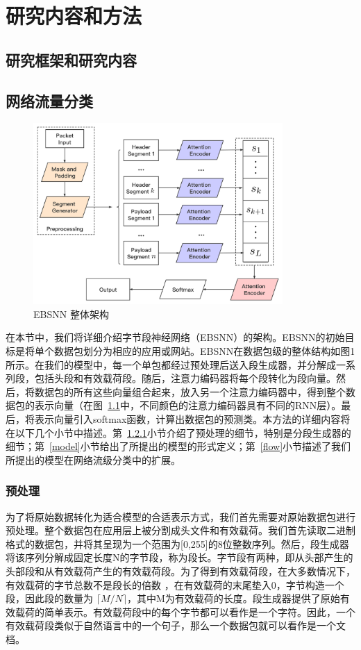 \documentclass[degree=master,cjk-font=noto]{thuthesis}
\begin{document}
\chapter{研究内容和方法}

\section{研究框架和研究内容}

\section{网络流量分类}

\begin{figure}[!htp]
	\centerline{\includegraphics[width=9.5cm]{Overall_EBSNN.png}}
	\caption{EBSNN 整体架构}
	\label{fig1}
\end{figure}

在本节中，我们将详细介绍字节段神经网络（EBSNN）的架构。EBSNN的初始目标是将单个数据包划分为相应的应用或网站。EBSNN在数据包级的整体结构如图1所示。在我们的模型中，每一个单包都经过预处理后送入段生成器，并分解成一系列段，包括头段和有效载荷段。随后，注意力编码器将每个段转化为段向量。然后，将数据包的所有这些向量组合起来，放入另一个注意力编码器中，得到整个数据包的表示向量（在图~\ref{fig1}中，不同颜色的注意力编码器具有不同的RNN层）。最后，将表示向量引入softmax函数，计算出数据包的预测类。本方法的详细内容将在以下几个小节中描述。第~\ref{prep}小节介绍了预处理的细节，特别是分段生成器的细节；第~\ref{model}小节给出了所提出的模型的形式定义；第~\ref{flow}小节描述了我们所提出的模型在网络流级分类中的扩展。

\subsection{预处理}
\label{prep}

为了将原始数据转化为适合模型的合适表示方式，我们首先需要对原始数据包进行预处理。整个数据包在应用层上被分割成头文件和有效载荷。我们首先读取二进制格式的数据包，并将其呈现为一个范围为[0,255]的8位整数序列。然后，段生成器将该序列分解成固定长度N的字节段，称为段长。字节段有两种，即从头部产生的头部段和从有效载荷产生的有效载荷段。为了得到有效载荷段，在大多数情况下，有效载荷的字节总数不是段长的倍数 ，在有效载荷的末尾垫入0，字节构造一个段，因此段的数量为 $\lceil M / N \rceil$，其中M为有效载荷的长度。段生成器提供了原始有效载荷的简单表示。有效载荷段中的每个字节都可以看作是一个字符。因此，一个有效载荷段类似于自然语言中的一个句子，那么一个数据包就可以看作是一个文档。
\end{document}
